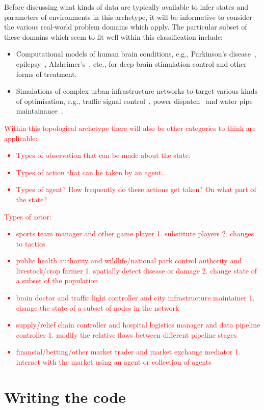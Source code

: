 Before discussing what kinds of data are typically available to infer states and parameters of environments in this archetype, it will be informative to consider the various real-world problem domains which apply. The particular subset of these domains which seem to fit well within this classification include:
\begin{itemize}
\item{Computational models of human brain conditions, e.g., Parkinson's disease~\cite{lu2019application}, epilepsy~\cite{pineau2009treating}, Alzheimer's~\cite{saboo2021reinforcement}, etc., for deep brain stimulation control and other forms of treatment.}
\item{Simulations of complex urban infrastructure networks to target various kinds of optimisation, e.g., traffic signal control~\cite{yau2017survey}, power dispatch~\cite{li2021integrating} and water pipe maintainance~\cite{bukhsh2023maintenance}.}
\end{itemize}

\textcolor{red}{Within this topological archetype there will also be other categories to think are applicable:
\begin{itemize}
\item{Types of observation that can be made about the state.}
\item{Types of action that can be taken by an agent.}
\item{Types of agent? How frequently do these actions get taken? On what part of the state?}
\end{itemize}
}


\textcolor{red}{Types of actor:
\begin{itemize}
\item{sports team manager and other game player 1. substitute players 2. changes to tactics}
\item{public health authority and wildlife/national park control authority and livestock/crop farmer 1. spatially detect disease or damage 2. change state of a subset of the population}
\item{brain doctor and traffic light controller and city infrastructure maintainer 1. change the state of a subset of nodes in the network}
\item{supply/relief chain controller and hospital logistics manager and data pipeline controller 1. modify the relative flows between different pipeline stages}
\item{financial/betting/other market trader and market exchange mediator 1. interact with the market using an agent or collection of agents}
\end{itemize}}

\section{\sffamily Writing the code}